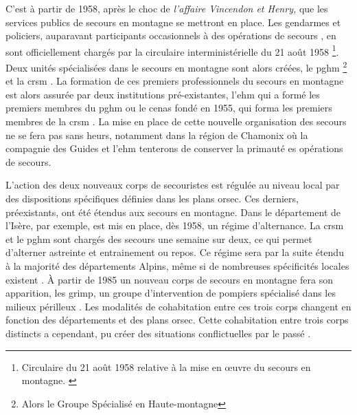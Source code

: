 C'est à partir de 1958, après le choc de \emph{l'affaire Vincendon et
  Henry,} que les services publics de secours en montagne se mettront
en place. Les gendarmes et policiers, auparavant participants
occasionnels à des opérations de secours
\autocite{Mollaret2016,CFDLD}, en sont officiellement chargés par la
circulaire interministérielle du 21 août 1958 \footnote{Circulaire  du 21 août 1958 relative à la mise en œuvre du secours en
  montagne. \label{fn:circulaire_21_aout_58}}. Deux unités
spécialisées dans le secours en montagne sont alors créées, le
\ac{pghm} \footnote{Alors le Groupe Spécialisé en Haute-montagne} et
la \ac{crsm} \autocite{Halle2007}. La formation de ces premiers
professionnels du secours en montagne est alors assurée par deux
institutions pré-existantes, l'\ac{ehm} qui a formé les premiers
membres du \ac{pghm} ou le \ac{cenas} fondé en 1955, qui forma les
premiers membres de la \ac{crsm} \autocite{Mezin2016}. La mise en
place de cette nouvelle organisation des secours ne se fera pas sans
heurs, notamment dans la région de Chamonix où la compagnie des Guides
et l'\ac{ehm} tenterons de conserver la primauté es opérations de
secours.

L'action des deux nouveaux corps de secouristes est régulée au niveau
local par des dispositions spécifiques définies dans les plans
\ac{orsec}. Ces derniers, préexistants, ont été étendus aux secours en
montagne. Dans le département de l'Isère, par exemple, est mis en
place, dès 1958, un régime d'alternance. La \ac{crsm} et le \ac{pghm}
sont chargés des secours une semaine sur deux, ce qui permet
d'alterner astreinte et entrainement ou repos. Ce régime sera par la
suite étendu à la majorité des départements Alpins, même si de
nombreuses spécificités locales existent \autocite{Halle2007}. À
partir de 1985 un nouveau corps de secours en montagne fera son
apparition, les \ac{grimp}, un groupe d'intervention de pompiers
spécialisé dans les milieux périlleux \autocite{CFDLD}. Les modalités
de cohabitation entre ces trois corps changent en fonction des
départements et des plans \ac{orsec}. Cette cohabitation entre trois
corps distincts a cependant, pu créer des situations conflictuelles
par le passé \autocite{Soule2002, Ganser2012}.


